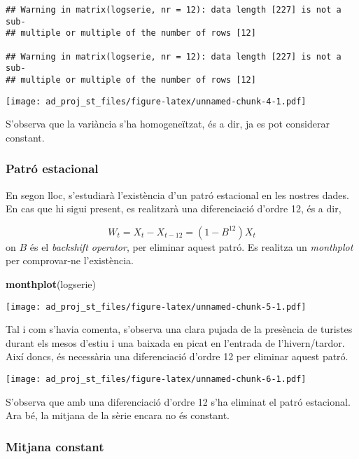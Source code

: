 \documentclass[]{article}
\newenvironment{Shaded}{\begin{snugshade}}{\end{snugshade}}
\newcommand{\KeywordTok}[1]{\textcolor[rgb]{0.13,0.29,0.53}{\textbf{#1}}}
\newcommand{\NormalTok}[1]{#1}
\begin{document}
\begin{verbatim}
## Warning in matrix(logserie, nr = 12): data length [227] is not a sub-
## multiple or multiple of the number of rows [12]

## Warning in matrix(logserie, nr = 12): data length [227] is not a sub-
## multiple or multiple of the number of rows [12]
\end{verbatim}

\texttt{[image: ad\_proj\_st\_files/figure-latex/unnamed-chunk-4-1.pdf]}

S'observa que la variància s'ha homogeneïtzat, és a dir, ja es pot
considerar constant.

\subsubsection{Patró estacional}\label{patro-estacional}

En segon lloc, s'estudiarà l'existència d'un patró estacional en les
nostres dades. En cas que hi sigui present, es realitzarà una
diferenciació d'ordre 12, és a dir,

\[ W_t = X_t - X_{t-12} = (1 - B^{12})X_t \] on \(B\) és el
\emph{backshift operator}, per eliminar aquest patró. Es realitza un
\emph{monthplot} per comprovar-ne l'existència.

\begin{Shaded}
\begin{Highlighting}[]
\KeywordTok{monthplot}\NormalTok{(logserie)}
\end{Highlighting}
\end{Shaded}

\texttt{[image: ad\_proj\_st\_files/figure-latex/unnamed-chunk-5-1.pdf]}

Tal i com s'havia comenta, s'observa una clara pujada de la presència de
turistes durant els mesos d'estiu i una baixada en picat en l'entrada de
l'hivern/tardor. Així doncs, és necessària una diferenciació d'ordre 12
per eliminar aquest patró.

\texttt{[image: ad\_proj\_st\_files/figure-latex/unnamed-chunk-6-1.pdf]}

S'observa que amb una diferenciació d'ordre 12 s'ha eliminat el patró
estacional. Ara bé, la mitjana de la sèrie encara no és constant.

\subsubsection{Mitjana constant}\label{mitjana-constant}
\end{document}
